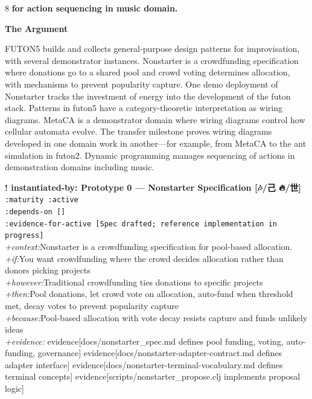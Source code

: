 \documentclass[landscape]{article}
\newcommand{\flexitag}[1]{\textcolor[gray]{0.35}{\textit{#1}}}
\newenvironment{devmapactive}{%
  \def\FrameCommand{\colorbox{devmapactivebg}}%
  \setlength{\fboxsep}{2pt}%
  \MakeFramed{\advance\hsize-\width \FrameRestore}%
}{\endMakeFramed}
\begin{document}
\begin{paracol}{8}
\textbf{for action sequencing in music domain.}\\
\par
\textbf{The Argument}\par
\par
FUTON5 builds and collects general-purpose design patterns for improvisation, with several demonstrator instances. Nonstarter is a crowdfunding specification where donations go to a shared pool and crowd voting determines allocation, with mechanisms to prevent popularity capture. One demo deployment of Nonstarter tracks the investment of energy into the development of the futon stack. Patterns in futon5 have a category-theoretic interpretation as wiring diagrams. MetaCA is a demonstrator domain where wiring diagrams control how cellular automata evolve. The transfer milestone proves wiring diagrams developed in one domain work in another—for example, from MetaCA to the ant simulation in futon2. Dynamic programming manages sequencing of actions in demonstration domains including music.\\
\par
\par
\begin{devmapactive}
\textbf{! instantiated-by: Prototype 0 — Nonstarter Specification [🎶/己 🔥/世]}\\
  \texttt{:\allowbreak{}maturity :\allowbreak{}active}\\
  \texttt{:\allowbreak{}depends-\allowbreak{}on []}\\
  \texttt{:\allowbreak{}evidence-\allowbreak{}for-\allowbreak{}active [Spec drafted;\allowbreak{} reference implementation in progress]}\\
  \flexitag{+context:}Nonstarter is a crowdfunding specification for pool-based allocation.\\
  \flexitag{+if:}You want crowdfunding where the crowd decides allocation rather than donors picking projects\\
  \flexitag{+however:}Traditional crowdfunding ties donations to specific projects\\
  \flexitag{+then:}Pool donations, let crowd vote on allocation, auto-fund when threshold met, decay votes to prevent popularity capture\\
  \flexitag{+because:}Pool-based allocation with vote decay resists capture and funds unlikely ideas\\
  \flexitag{+evidence:} evidence[docs/nonstarter\_spec.md defines pool funding, voting, auto-funding, governance] evidence[docs/nonstarter-adapter-contract.md defines adapter interface] evidence[docs/nonstarter-terminal-vocabulary.md defines terminal concepts] evidence[scripts/nonstarter\_propose.clj implements proposal logic]\\

\end{devmapactive}
\end{paracol}
\end{document}
